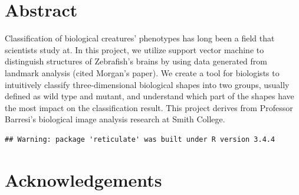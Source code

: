 \documentclass[10pt,letterpaper]{article}
\date{}
\newcommand{\getIndex}[2]{
  \ForEach{,}{\IfEq{#1}{\thislevelitem}{\number\thislevelcount\ExitForEach}{}}{#2}
}
\newcommand{\getAff}[1]{
  \getIndex{#1}{Smith College}
}
\begin{document}
\vspace*{0.2in}

\section*{Abstract}
Classification of biological creatures' phenotypes has long been a field
that scientists study at. In this project, we utilize support vector
machine to distinguish structures of Zebrafish's brains by using data
generated from landmark analysis (cited Morgan's paper). We create a
tool for biologists to intuitively classify three-dimensional biological
shapes into two groups, usually defined as wild type and mutant, and
understand which part of the shapes have the most impact on the
classification result. This project derives from Professor Barresi's
biological image analysis research at Smith College.


\linenumbers

\begin{verbatim}
## Warning: package 'reticulate' was built under R version 3.4.4
\end{verbatim}

\section{Acknowledgements}\label{acknowledgements}
\end{document}
